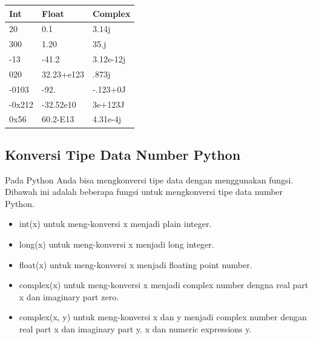 \begin{center}
\begin{tabular}{ | m{3cm} | m{3cm} | m{3cm} | }
\hline
Int & Float & Complex \\
\hline
20 & 0.1 & 3.14j \\
\hline
300 & 1.20 & 35.j \\
\hline
-13 & -41.2 & 3.12e-12j \\
\hline
020 & 32.23+e123 & .873j \\
\hline
-0103 & -92. & -.123+0J \\
\hline
-0x212 & -32.52e10 & 3e+123J \\
\hline
0x56 & 60.2-E13 & 4.31e-4j \\
\hline
\end{tabular}
\end{center}


\subsection{Konversi Tipe Data Number Python}
Pada Python Anda bisa mengkonversi tipe data dengan menggunakan fungsi. Dibawah ini adalah beberapa fungsi untuk mengkonversi tipe data number Python.
\begin{itemize}
\item int(x) untuk meng-konversi x menjadi plain integer.
\item long(x) untuk meng-konversi x menjadi long integer.
\item float(x) untuk meng-konversi x menjadi floating point number.
\item complex(x) untuk meng-konversi x menjadi complex number dengna real part x dan imaginary part zero.
\item complex(x, y) untuk meng-konversi x dan y menjadi complex number dengan real part x dan imaginary part y. x dan numeric expressions y.
\end{itemize}


